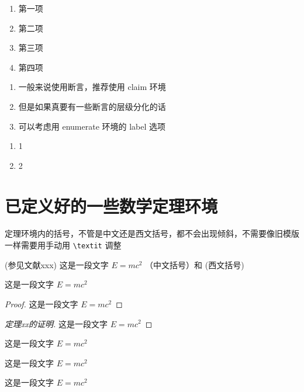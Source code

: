 \begin{enumerate}[I]
  \item 第一项
  \item 第二项
  \item 第三项
  \item 第四项
\end{enumerate}

\begin{enumerate}[label = \textbf{断言} \Alph*]
  \item 一般来说使用断言，推荐使用 claim 环境
  \item 但是如果真要有一些断言的层级分化的话
  \item 可以考虑用 enumerate 环境的 label 选项
\end{enumerate}

\begin{enumerate}[\textbf{断言} A]
  \item 1
  \item 2
\end{enumerate}


\section{已定义好的一些数学定理环境}

定理环境内的括号，不管是中文还是西文括号，都不会出现倾斜，不需要像旧模版一样需要用手动用 \verb|\textit| 调整
\begin{definition}[测度]
  (参见文献xxx) 这是一段文字 $E = m c^2$  （中文括号）和 (西文括号)
\end{definition}

\begin{theorem}
  这是一段文字 $E = m c^2$
\end{theorem}


\begin{proof}
  这是一段文字 $E = m c^2$
\end{proof}

\begin{proof}[定理xx的证明]
  这是一段文字 $E = m c^2$
\end{proof}

\begin{example}
  这是一段文字 $E = m c^2$
\end{example}

\begin{property}
  这是一段文字 $E = m c^2$
\end{property}

\begin{proposition}
  这是一段文字 $E = m c^2$
\end{proposition}

